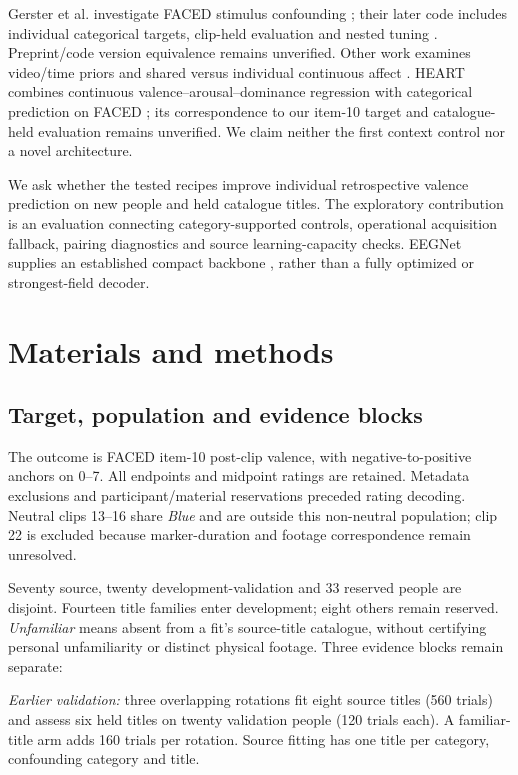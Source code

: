 \documentclass[10pt,letterpaper]{article}
\begin{document}
Gerster et al. investigate FACED stimulus confounding \cite{gerster2026stimulus}; their later code includes individual categorical targets, clip-held evaluation and nested tuning \cite{gerster2026code}. Preprint/code version equivalence remains unverified. Other work examines video/time priors and shared versus individual continuous affect \cite{kong2026priors,wang2026shared}. HEART combines continuous valence--arousal--dominance regression with categorical prediction on FACED \cite{fernandez2026heart}; its correspondence to our item-10 target and catalogue-held evaluation remains unverified. We claim neither the first context control nor a novel architecture.

We ask whether the tested recipes improve individual retrospective valence prediction on new people and held catalogue titles. The exploratory contribution is an evaluation connecting category-supported controls, operational acquisition fallback, pairing diagnostics and source learning-capacity checks. EEGNet supplies an established compact backbone \cite{lawhern2018eegnet}, rather than a fully optimized or strongest-field decoder.

\section{Materials and methods}
\subsection{Target, population and evidence blocks}
The outcome is FACED item-10 post-clip valence, with negative-to-positive anchors on 0--7. All endpoints and midpoint ratings are retained. Metadata exclusions and participant/material reservations preceded rating decoding. Neutral clips 13--16 share \emph{Blue} and are outside this non-neutral population; clip 22 is excluded because marker-duration and footage correspondence remain unresolved.

Seventy source, twenty development-validation and 33 reserved people are disjoint. Fourteen title families enter development; eight others remain reserved. \emph{Unfamiliar} means absent from a fit's source-title catalogue, without certifying personal unfamiliarity or distinct physical footage. Three evidence blocks remain separate:

\textit{Earlier validation:} three overlapping rotations fit eight source titles (560 trials) and assess six held titles on twenty validation people (120 trials each). A familiar-title arm adds 160 trials per rotation. Source fitting has one title per category, confounding category and title.
\end{document}
